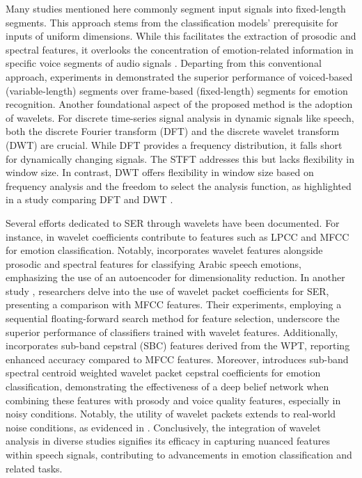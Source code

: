 Many studies mentioned here commonly segment input signals into fixed-length segments. This approach stems from the classification models' prerequisite for inputs of uniform dimensions. While this facilitates the extraction of prosodic and spectral features, it overlooks the concentration of emotion-related information in specific voice segments of audio signals \cite{cowie2001emotion}. Departing from this conventional approach, experiments in \cite{mansoorizadeh2007speech} demonstrated the superior performance of voiced-based (variable-length) segments over frame-based (fixed-length) segments for emotion recognition. Another foundational aspect of the proposed method is the adoption of wavelets. For discrete time-series signal analysis in dynamic signals like speech, both the discrete Fourier transform (DFT) and the discrete wavelet transform (DWT) are crucial. While DFT provides a frequency distribution, it falls short for dynamically changing signals. The STFT addresses this but lacks flexibility in window size. In contrast, DWT offers flexibility in window size based on frequency analysis and the freedom to select the analysis function, as highlighted in a study comparing DFT and DWT \cite{steinbuch2005wavelet}.

Several efforts dedicated to SER through wavelets have been documented. For instance, in \cite{palo2018wavelet} wavelet coefficients contribute to features such as LPCC and MFCC for emotion classification. Notably, \cite{abdel2020egyptian} incorporates wavelet features alongside prosodic and spectral features for classifying Arabic speech emotions, emphasizing the use of an autoencoder for dimensionality reduction. In another study \cite{wang2020wavelet}, researchers delve into the use of wavelet packet coefficients for SER, presenting a comparison with MFCC features. Their experiments, employing a sequential floating-forward search method for feature selection, underscore the superior performance of classifiers trained with wavelet features. Additionally, \cite{kishore2013emotion} incorporates sub-band cepstral (SBC) features derived from the WPT, reporting enhanced accuracy compared to MFCC features. Moreover, \cite{huang2019feature} introduces sub-band spectral centroid weighted wavelet packet cepstral coefficients for emotion classification, demonstrating the effectiveness of a deep belief network when combining these features with prosody and voice quality features, especially in noisy conditions. Notably, the utility of wavelet packets extends to real-world noise conditions, as evidenced in \cite{vasquez2015emotion}. Conclusively, the integration of wavelet analysis in diverse studies signifies its efficacy in capturing nuanced features within speech signals, contributing to advancements in emotion classification and related tasks.